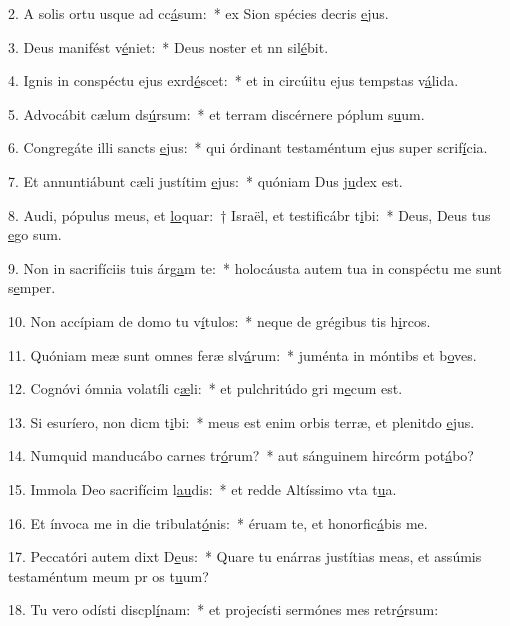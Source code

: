 2. A solis ortu usque ad cc\uline{á}sum:~* ex Sion spécies decris \uline{e}jus.\par 
3. Deus manifést v\uline{é}niet:~* Deus noster et nn sil\uline{é}bit.\par 
4. Ignis in conspéctu ejus exrd\uline{é}scet:~* et in circúitu ejus tempstas v\uline{á}lida.\par 
5. Advocábit cælum ds\uline{ú}rsum:~* et terram discérnere póplum s\uline{u}um.\par 
6. Congregáte illi sancts \uline{e}jus:~* qui órdinant testaméntum ejus super scrif\uline{í}cia.\par 
7. Et annuntiábunt cæli justítim \uline{e}jus:~* quóniam Dus j\uline{u}dex est.\par 
8. Audi, pópulus meus, et \uline{lo}quar:~† Israël, et testificábr t\uline{i}bi:~* Deus, Deus tus \uline{e}go sum.\par 
9. Non in sacrifíciis tuis árg\uline{a}m te:~* holocáusta autem tua in conspéctu me sunt s\uline{e}mper.\par 
10. Non accípiam de domo tu v\uline{í}tulos:~* neque de grégibus tis h\uline{i}rcos.\par 
11. Quóniam meæ sunt omnes feræ slv\uline{á}rum:~* juménta in móntibs et b\uline{o}ves.\par 
12. Cognóvi ómnia volatíli c\uline{æ}li:~* et pulchritúdo gri m\uline{e}cum est.\par 
13. Si esuríero, non dicm t\uline{i}bi:~* meus est enim orbis terræ, et plenitdo \uline{e}jus.\par 
14. Numquid manducábo carnes tr\uline{ó}rum?~* aut sánguinem hircórm pot\uline{á}bo?\par 
15. Immola Deo sacrifícim l\uline{au}dis:~* et redde Altíssimo vta t\uline{u}a.\par 
16. Et ínvoca me in die tribulat\uline{ó}nis:~* éruam te, et honorfic\uline{á}bis me.\par 
17. Peccatóri autem dixt D\uline{e}us:~* Quare tu enárras justítias meas, et assúmis testaméntum meum pr os t\uline{u}um?\par 
18. Tu vero odísti discpl\uline{í}nam:~* et projecísti sermónes mes retr\uline{ó}rsum:\par 
